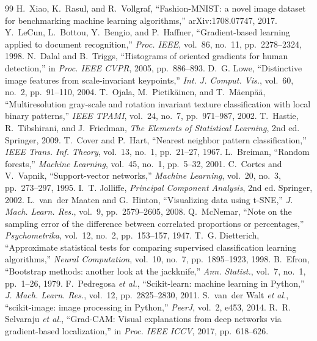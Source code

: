 \documentclass[conference]{IEEEtran}
\begin{document}
\begin{thebibliography}{99}
 H.~Xiao, K.~Rasul, and R.~Vollgraf, ``Fashion-MNIST: a novel image dataset for benchmarking machine learning algorithms,'' arXiv:1708.07747, 2017.
 Y.~LeCun, L.~Bottou, Y.~Bengio, and P.~Haffner, ``Gradient-based learning applied to document recognition,'' \emph{Proc. IEEE}, vol.~86, no.~11, pp.~2278--2324, 1998.
 N.~Dalal and B.~Triggs, ``Histograms of oriented gradients for human detection,'' in \emph{Proc. IEEE CVPR}, 2005, pp.~886--893.
 D.~G. Lowe, ``Distinctive image features from scale-invariant keypoints,'' \emph{Int. J. Comput. Vis.}, vol.~60, no.~2, pp.~91--110, 2004.
 T.~Ojala, M.~Pietik\"ainen, and T.~M\"aenp\"a\"a, ``Multiresolution gray-scale and rotation invariant texture classification with local binary patterns,'' \emph{IEEE TPAMI}, vol.~24, no.~7, pp.~971--987, 2002.
 T.~Hastie, R.~Tibshirani, and J.~Friedman, \emph{The Elements of Statistical Learning}, 2nd ed. Springer, 2009.
 T.~Cover and P.~Hart, ``Nearest neighbor pattern classification,'' \emph{IEEE Trans. Inf. Theory}, vol.~13, no.~1, pp.~21--27, 1967.
 L.~Breiman, ``Random forests,'' \emph{Machine Learning}, vol.~45, no.~1, pp.~5--32, 2001.
 C.~Cortes and V.~Vapnik, ``Support-vector networks,'' \emph{Machine Learning}, vol.~20, no.~3, pp.~273--297, 1995.
 I.~T. Jolliffe, \emph{Principal Component Analysis}, 2nd ed. Springer, 2002.
 L.~van~der Maaten and G.~Hinton, ``Visualizing data using t-SNE,'' \emph{J. Mach. Learn. Res.}, vol.~9, pp.~2579--2605, 2008.
 Q.~McNemar, ``Note on the sampling error of the difference between correlated proportions or percentages,'' \emph{Psychometrika}, vol.~12, no.~2, pp.~153--157, 1947.
 T.~G. Dietterich, ``Approximate statistical tests for comparing supervised classification learning algorithms,'' \emph{Neural Computation}, vol.~10, no.~7, pp.~1895--1923, 1998.
 B.~Efron, ``Bootstrap methods: another look at the jackknife,'' \emph{Ann. Statist.}, vol.~7, no.~1, pp.~1--26, 1979.
 F.~Pedregosa \emph{et al.}, ``Scikit-learn: machine learning in Python,'' \emph{J. Mach. Learn. Res.}, vol.~12, pp.~2825--2830, 2011.
 S.~van~der Walt \emph{et al.}, ``scikit-image: image processing in Python,'' \emph{PeerJ}, vol.~2, e453, 2014.
 R.~R. Selvaraju \emph{et al.}, ``Grad-CAM: Visual explanations from deep networks via gradient-based localization,'' in \emph{Proc. IEEE ICCV}, 2017, pp.~618--626.
\end{thebibliography}
\end{document}
